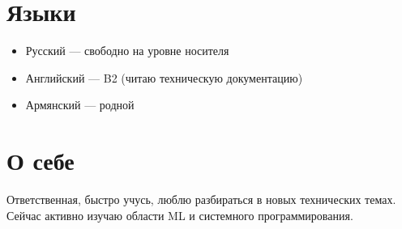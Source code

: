 \documentclass[a4paper,10pt]{article}
\begin{document}
\section*{Языки}
\begin{itemize}[leftmargin=*]
  \item Русский — свободно на уровне носителя
  \item Английский — B2 (читаю техническую документацию)
  \item Армянский — родной
\end{itemize}

\section*{О себе}
Ответственная, быстро учусь, люблю разбираться в новых технических темах. Сейчас активно изучаю области ML и системного программирования.
\end{document}
